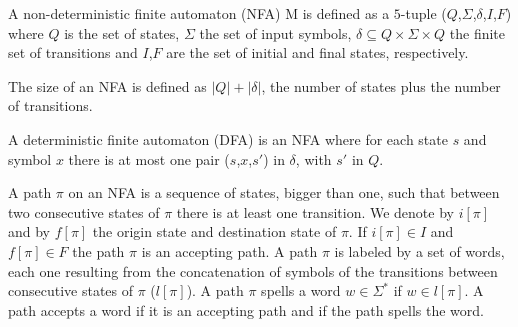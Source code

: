 \begin{definition}
A non-deterministic finite automaton (NFA) M is defined as a $5$-tuple ($Q$,$\Sigma$,$\delta$,$I$,$F$) where $Q$ is the set of states, $\Sigma$ the set of input symbols, $\delta \subseteq Q \times \Sigma \times Q$ the finite set of transitions and $I$,$F$ are the set of initial and final states, respectively.
\end{definition}

The size of an NFA is defined as $|Q|+|\delta|$, the number of states plus the number of transitions.


\begin{definition}
A deterministic finite automaton (DFA) is an NFA where for each state $s$ and symbol $x$ there is at most one pair ($s$,$x$,$s'$) in $\delta$, with $s'$ in $Q$.
\end{definition}

\begin{definition}
A path $\pi$ on an NFA is a sequence of states, bigger than one, such that between two consecutive states of $\pi$ there is at least one transition. We denote by $i[\pi]$ and by $f[\pi]$ the origin state and destination state of $\pi$. If $i[\pi] \in I$ and $f[\pi] \in F$ the path $\pi$ is an accepting path. A path $\pi$ is labeled by a set of words, each one resulting from the concatenation of symbols of the transitions between consecutive states of $\pi$ ($l[\pi]$). A path $\pi$ spells a word $w \in \Sigma^*$ if $w \in l[\pi]$.
A path accepts a word if it is an accepting path and if the path spells the word.
\end{definition}


